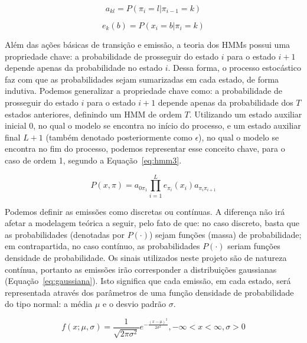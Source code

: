 \begin{equation}\label{eq:hmm1}
    a_{kl} = P(\pi_i = l | \pi_{i-1} = k)
\end{equation}

\begin{equation}\label{eq:hmm2}
    e_k(b) = P(x_i = b | \pi_i = k)
\end{equation}

Além das ações básicas de transição e emissão, a teoria dos HMMs possui uma propriedade chave: a probabilidade de prosseguir do estado $ i $ para o estado $ i+1 $ depende apenas da probabilidade no estado $ i $. Dessa forma, o processo estocástico faz com que as probabilidades sejam sumarizadas em cada estado, de forma indutiva. Podemos generalizar a propriedade chave como: a probabilidade de prosseguir do estado $ i $ para o estado $ i+1 $ depende apenas da probabilidade dos $ T $ estados anteriores, definindo um HMM de ordem $ T $. Utilizando um estado auxiliar inicial $ 0 $, no qual o modelo se encontra no início do processo, e um estado auxiliar final $ L + 1 $ (também denotado posteriormente como $ \epsilon $), no qual o modelo se encontra no fim do processo, podemos representar esse conceito chave, para o caso de ordem 1, segundo a Equação~\ref{eq:hmm3}.

\begin{equation}\label{eq:hmm3}
    P(x,\pi) = a_{0\pi_1} \prod_{i=1}^{L} e_{\pi_i}(x_i)a_{{\pi_i}{\pi_{i+1}}}
\end{equation}

Podemos definir as emissões como discretas ou contínuas. A diferença não irá afetar a modelagem teórica a seguir, pelo fato de que: no caso discreto, basta que as probabilidades (denotadas por $ P(\cdot) $) sejam funções (massa) de probabilidade; em contrapartida, no caso contínuo, as probabilidades $ P(\cdot) $ seriam funções densidade de probabilidade. Os sinais utilizados neste projeto são de natureza contínua, portanto as emissões irão corresponder a distribuições gaussianas (Equação~\ref{eq:gaussiana}). Isto significa que cada emissão, em cada estado, será representada através dos parâmetros de uma função densidade de probabilidade do tipo normal: a média $ \mu $ e o desvio padrão $ \sigma $.

\begin{equation}\label{eq:gaussiana}
    f(x;\mu,\sigma) = \frac{1}{\sqrt{2\pi\sigma^2}} {e}^{-\frac{{(x-\mu)}^2}{2\sigma^2}}, -\infty < x < \infty, \sigma > 0
\end{equation}

